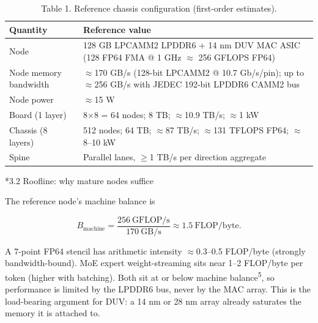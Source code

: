 \documentclass[12pt]{article}
\makeatletter
\renewcommand\subsection{\@startsection{subsection}{2}{\z@}{-1.0ex \@plus -0.2ex}{0.3ex}{\normalsize\bfseries}}
\makeatother
\begin{document}
\begin{table}[h!]
\centering
\caption{Table 1. Reference chassis configuration (first-order estimates).}
\begin{tabular}{p{}p{}}
\toprule


Quantity & Reference value \\

\midrule

Node & 128 GB LPCAMM2 LPDDR6 + 14 nm DUV MAC ASIC (128 FP64 FMA @ 1 GHz $\approx$ 256 GFLOPS FP64) \\

Node memory bandwidth & $\approx$170 GB/s (128-bit LPCAMM2 @ 10.7 Gb/s/pin); up to $\approx$256 GB/s with JEDEC 192-bit LPDDR6 CAMM2 bus \\

Node power & $\approx$15 W \\

Board (1 layer) & 8$\times$8 = 64 nodes; 8 TB; $\approx$10.9 TB/s; $\approx$1 kW \\

Chassis (8 layers) & 512 nodes; 64 TB; $\approx$87 TB/s; $\approx$131 TFLOPS FP64; $\approx$8--10 kW \\

Spine & Parallel lanes, $\geq$1 TB/s per direction aggregate \\

\bottomrule
\end{tabular}
\end{table}

\subsection*{3.2 Roofline: why mature nodes suffice}

The reference node's machine balance is

\begin{equation*}
B_{\mathrm{machine}} = \frac{256\ \mathrm{GFLOP/s}}{170\ \mathrm{GB/s}} \approx 1.5\ \mathrm{FLOP/byte}.
\end{equation*}

A 7-point FP64 stencil has arithmetic intensity $\approx$0.3--0.5 FLOP/byte (strongly bandwidth-bound). MoE expert weight-streaming sits near 1--2 FLOP/byte per token (higher with batching). Both sit at or below machine balance\textsuperscript{5}, so performance is limited by the LPDDR6 bus, never by the MAC array. This is the load-bearing argument for DUV: a 14 nm or 28 nm array already saturates the memory it is attached to.
\end{document}
